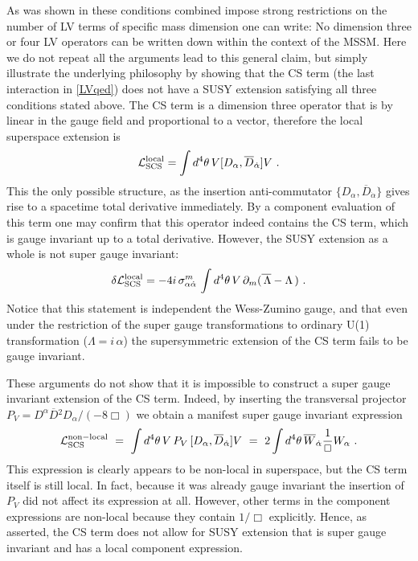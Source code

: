 \documentclass[12pt]{revtex4}
\begin{document}
As was shown in \cite{GrootNibbelink:2004za} these conditions 
combined impose strong restrictions on the number of LV terms of
specific mass dimension one can write: No dimension three or four
LV operators can be written down within the context of the MSSM. 
Here we do not repeat all the arguments lead to this general claim,
but simply illustrate the underlying philosophy by showing that the CS
term (the last interaction in \eqref{LVqed}) does not have a SUSY
extension satisfying all three conditions stated above. The CS term is
a dimension three operator that is by linear in the gauge field and
proportional to a vector, therefore the local superspace extension is 
\begin{equation}
{\cal L}_{\rm SCS}^{\rm local} = \int d^4 \theta \, 
V [ D_\alpha, \overline{D}_{\dot\alpha}] V~.
\end{equation} 
This the only possible structure, as the insertion anti-commutator 
$\{D_\alpha, \overline{D}_{\dot\alpha}\}$ gives rise to a spacetime
total derivative immediately. By a component evaluation of this term
one may confirm that this operator indeed contains the CS term, which
is gauge invariant up to a total derivative. However, the
SUSY extension as a whole is not super gauge invariant: 
\begin{equation}
\delta {\cal L}_{\rm SCS}^{\rm local} 
= - 4 i\, \sigma_{\alpha\dot{\alpha}}^m\, 
\int d^4 \theta \, 
V\, \partial_m ( \overline{\, \Lambda} - \Lambda \,)~. 
\end{equation} 
Notice that this statement is independent the Wess-Zumino
gauge, and that even under the restriction of  the super gauge
transformations to ordinary U(1) transformation 
($\Lambda = i \,\alpha$) the supersymmetric extension of the CS term
fails to be gauge invariant.  


These arguments do not show that it is impossible to construct a super
gauge invariant extension of the CS term. Indeed, by inserting the
transversal projector 
$P_V = D^\alpha \overline{D}{}^2 D_\alpha/(-8 \Box)$
we obtain a manifest super gauge invariant expression 
\begin{equation}
{\cal L}_{\rm SCS}^{\rm non-local} ~=~ \int d^4 \theta \, 
V\, P_V\,  [ D_\alpha, \overline{D}_{\dot\alpha}] V
~=~
2 \int d^4 \theta \, 
\overline{W}_{\dot\alpha} \frac 1{\Box} W_\alpha
~.
\end{equation} 
This expression is clearly appears to be non-local in superspace, but
the CS term itself is still local. In fact, because it was already
gauge invariant the insertion of $P_V$ did not affect its expression
at all. However, other terms in the component expressions are
non-local because they contain $1/\Box$ explicitly. Hence, as
asserted, the CS term does not allow for SUSY extension that is super
gauge invariant and has a local component expression. 
\end{document}
